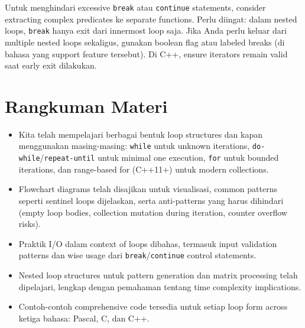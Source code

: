 \documentclass[../main.tex]{subfiles}
\begin{document}
Untuk menghindari excessive \texttt{break} atau \texttt{continue} statements, consider extracting complex predicates ke separate functions. Perlu diingat: dalam nested loops, \texttt{break} hanya exit dari innermost loop saja. Jika Anda perlu keluar dari multiple nested loops sekaligus, gunakan boolean flag atau labeled breaks (di bahasa yang support feature tersebut). Di C++, ensure iterators remain valid saat early exit dilakukan.
\section{Rangkuman Materi}
\begin{itemize}
  \item Kita telah mempelajari berbagai bentuk loop structures dan kapan menggunakan masing-masing: \texttt{while} untuk unknown iterations, \texttt{do-while}/\texttt{repeat-until} untuk minimal one execution, \texttt{for} untuk bounded iterations, dan range-based for (C++11+) untuk modern collections.
  \item Flowchart diagrams telah disajikan untuk visualisasi, common patterns seperti sentinel loops dijelaskan, serta anti-patterns yang harus dihindari (empty loop bodies, collection mutation during iteration, counter overflow risks).
  \item Praktik I/O dalam context of loops dibahas, termasuk input validation patterns dan wise usage dari \texttt{break}/\texttt{continue} control statements.
  \item Nested loop structures untuk pattern generation dan matrix processing telah dipelajari, lengkap dengan pemahaman tentang time complexity implications.
  \item Contoh-contoh comprehensive code tersedia untuk setiap loop form across ketiga bahasa: Pascal, C, dan C++.
\end{itemize}
\end{document}
